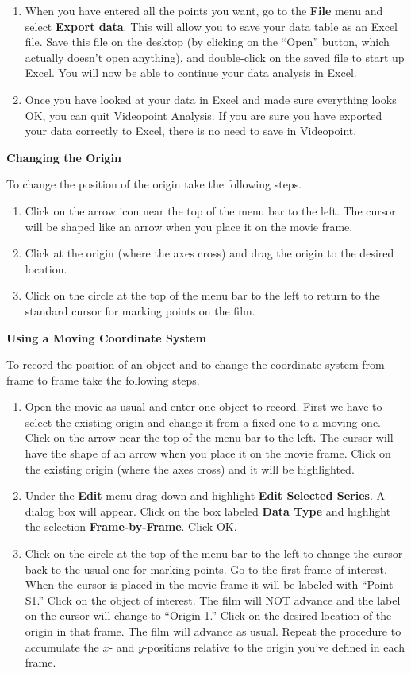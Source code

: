 \begin{enumerate}
\item When you have entered all the points you want, go to the
\textbf{File} menu and select \textbf{Export data}.  This will
allow you to save your data table as an Excel file. 
Save this
file on the desktop (by clicking on the ``Open'' button, which actually
doesn't open anything), and double-click on the saved file to start up Excel.
You will now be able to continue your data analysis in Excel.

\item Once you have looked at your data in Excel and made sure everything
looks OK, you can quit Videopoint Analysis.  If you are sure you have
exported your data correctly to Excel, there is no need to save in Videopoint.

\end{enumerate}
\textbf{Changing the Origin} 

To change the position of the origin take the following steps.

\begin{enumerate}
\item Click on the arrow icon near the top of the menu bar to the left.
The cursor will be shaped like an arrow when you place it on the movie
frame. 
\item Click at the origin (where the axes cross) and drag the origin to
the desired location. 
\item Click on the circle at the top of the menu bar to the left to return
to the standard cursor for marking points on the film. 
\end{enumerate}
\textbf{Using a Moving Coordinate System} 

To record the position of an object and to change the coordinate system
from frame to frame take the following steps.

\begin{enumerate}
\item Open the movie as usual and enter one object to record. First we have
to select the existing origin and change it from a fixed one to a
moving one. Click on the arrow near the top of the menu bar to the
left. The cursor will have the shape of an arrow when you place it
on the movie frame. Click on the existing origin (where the axes cross)
and it will be highlighted.
\item Under the \textbf{Edit} menu drag down and highlight \textbf{Edit
Selected Series}. A dialog box will appear. Click on the box labeled
\textbf{Data Type} and highlight the selection \textbf{Frame-by-Frame}.
Click OK.
\item Click on the circle at the top of the menu bar to the left to change
the cursor back to the usual one for marking points. Go to the first
frame of interest. When the cursor is placed in the movie frame it
will be labeled with ``Point S1.'' Click on the object of interest.
The film will NOT advance and the label on the cursor will change
to ``Origin 1.'' Click on the desired location of the origin
in that frame. The film will advance as usual. Repeat the procedure
to accumulate the $x$- and $y$-positions relative to the origin you've
defined in each frame.\end{enumerate}

